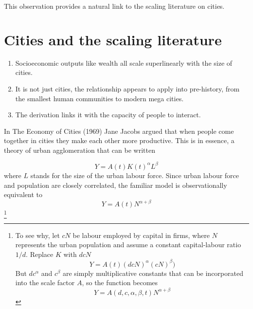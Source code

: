 This observation provides a natural link to the scaling literature on cities.



\section{Cities and the scaling literature}

\begin{enumerate}
 \item Socioeconomic outputs like wealth all scale superlinearly with the size of cities. 
\item It is not just cities, the relationship appears to apply into pre-history, from the smallest human communities to modern mega cities. %
\item The derivation links it with the capacity of people to interact.
\end{enumerate}



In The Economy of Cities (1969) Jane Jacobs argued that when people come together in cities they make each other more productive. This is in essence, a theory of urban agglomeration that can be written

\begin{equation}
Y = A(t) K(t)^\alpha L^\beta 
\label{eqn-production-jacobs}
\end{equation}
where $L$ stands for the size of the urban labour force. Since urban labour force and population are closely correlated, the familiar model is observationally equivalent to
\begin{equation}
Y = A(t)N^{\alpha+\beta}
\label{eqn-production-jacobs-2}
\end{equation}
\footnote{ To see why, let  $cN$ be labour employed by capital in firms, where $N$ represents the urban population and assume a constant capital-labour ratio $1/d$. Replace $K$ with $dcN$
\[Y = A(t) (dcN)^\alpha (cN)^\beta) \]
But  $dc^\alpha$ and $c^\beta$ are simply multiplicative constants that can be incorporated into the scale factor $A$, so the function becomes 
\[Y = A(d, c,\alpha, \beta, t)N^{\alpha+\beta}\]
}

